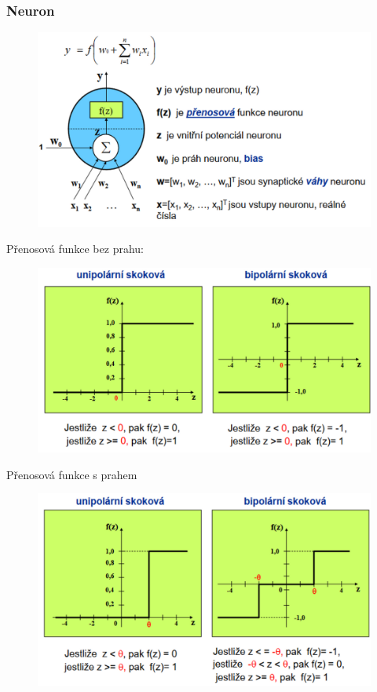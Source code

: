 \subsubsection{Neuron}
\begin{figure}[H]
    \includegraphics[scale = 0.2]{images/perceptron_neuron.png}
\end{figure}
\newpage
Přenosová funkce bez prahu:
\begin{figure}[H]
    \includegraphics[scale = 0.2]{images/perceptron_prenos.png}
\end{figure}
Přenosová funkce s prahem
\begin{figure}[H]
    \includegraphics[scale = 0.2]{images/perceptron_prenos_s_prahem.png}
\end{figure}

